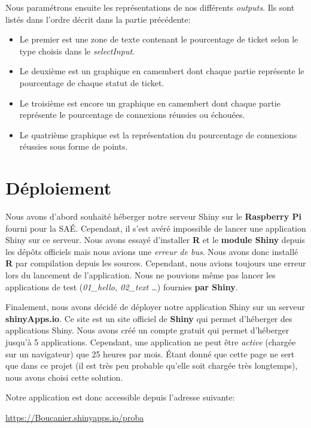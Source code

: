 \documentclass[12pt, a4paper]{article}
\begin{document}
\noindent Nous paramétrons ensuite les représentations de nos différents \textit{outputs}.
Ils sont listés dans l'ordre décrit dans la partie précédente:

\begin{itemize}
    \item Le premier est une zone de texte contenant le pourcentage de ticket selon le type choisis dans le \textit{selectInput}.
    \item Le deuxième est un graphique en camembert dont chaque partie représente le pourcentage de chaque statut de ticket.
    \item Le troisième est encore un graphique en camembert dont chaque partie représente le pourcentage de connexions réussies ou échouées.
    \item Le quatrième graphique est la représentation du pourcentage de connexions réussies sous forme de points.
\end{itemize}

\section{Déploiement}

Nous avons d'abord souhaité héberger notre serveur Shiny sur le \textbf{Raspberry Pi} fourni pour la SAÉ.
Cependant, il s'est avéré impossible de lancer une application Shiny sur ce serveur.
Nous avons essayé d'installer \textbf{R} et le \textbf{module Shiny} depuis les dépôts officiels mais nous avions une \textit{erreur de bus}.
Nous avons donc installé \textbf{R} par compilation depuis les sources.
Cependant, nous avions toujours une erreur lors du lancement de l'application.
Nous ne pouvions même pas lancer les applications de test (\textit{01\_hello, 02\_text \ldots}) fournies \textbf{par Shiny}.
\bigskip

Finalement, nous avons décidé de déployer notre application Shiny sur un serveur \textbf{shinyApps.io}.
Ce site est un site officiel de \textbf{Shiny} qui permet d'héberger des applications Shiny.
Nous avons créé un compte gratuit qui permet d'héberger jusqu'à 5 applications.
Cependant, une application ne peut être \textit{active} (chargée sur un navigateur) que 25 heures par mois.
Étant donné que cette page ne sert que dans ce projet (il est très peu probable qu'elle soit chargée très longtemps),
nous avons choisi cette solution.
\bigskip

\noindent Notre application est donc accessible depuis l'adresse suivante:
\begin{center}
    \url{https://Boucanier.shinyapps.io/proba}
\end{center}
\end{document}
